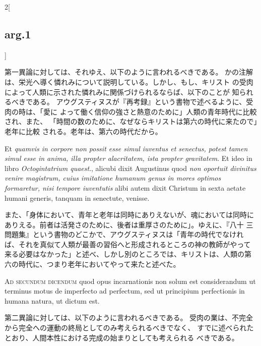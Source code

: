 \documentclass[paper=a4paper,fontsize=10pt,jafontsize=9pt,titlepage]{jlreq}
\begin{document}
\begin{paracol}{2}[\subsection{arg.1}]
\switchcolumn

第一異論に対しては、それゆえ、以下のように言われるべきである。
かの注解は、栄光へ導く憐れみについて説明している。しかし、もし、キリスト
 の受肉によって人類に示された憐れみに関係づけられるならば、以下のことが
 知られるべきである。
アウグスティヌスが『再考録』という書物で述べるように、受肉の時は、「愛に
 よって働く信仰の強さと熱意のために」人類の青年時代に比較され、また、
 「時間の数のために、なぜならキリストは第六の時代に来たので」老年に比較
 される。老年は、第六の時代だから。

\switchcolumn*

Et {\itshape quamvis in corpore non possit esse simul
iuventus et senectus, potest tamen simul esse in anima, illa propter
alacritatem, ista propter gravitatem}. Et ideo in libro {\itshape Octogintatrium
quaest}., alicubi dixit Augustinus quod {\itshape non oportuit divinitus venire
magistrum, cuius imitatione humanum genus in mores optimos formaretur,
nisi tempore iuventutis} alibi autem dixit Christum in sexta aetate
humani generis, tanquam in senectute, venisse.

\switchcolumn

また、「身体において、青年と老年は同時にありえないが、魂においては同時に
 ありえる。前者は活発さのために、後者は重厚さのために」。ゆえに、『八十
 三問題集』という書物のどこかで、アウグスティヌスは「青年の時代でなけれ
 ば、それを真似て人類が最善の習俗へと形成されるところの神の教師がやって
 来る必要はなかった」と述べ、しかし別のところでは、キリストは、人類の第
 六の時代に、つまり老年においてやって来たと述べた。

\switchcolumn*[\subsection{ad.2}]

{\scshape Ad secundum dicendum} quod opus incarnationis
non solum est considerandum ut terminus motus de imperfecto ad
perfectum, sed ut principium perfectionis in humana natura, ut dictum
est.

\switchcolumn

第二異論に対しては、以下のように言われるべきである。
受肉の業は、不完全から完全への運動の終局としてのみ考えられるべきでなく、
 すでに述べられたとおり、人間本性における完成の始まりとしても考えられる
 べきである。

\switchcolumn*[\subsection{ad.3}]


\end{paracol}
\end{document}
